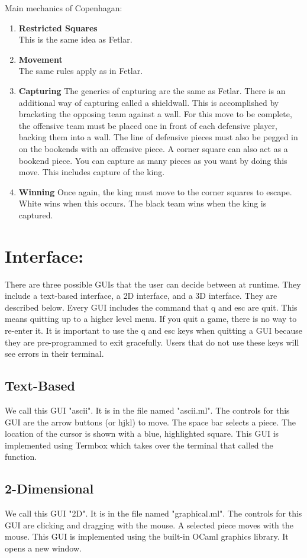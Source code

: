 \documentclass[11pt, oneside]{article}
\begin{document}
Main mechanics of Copenhagan:
\begin{enumerate}
\item \textbf{Restricted Squares}\\
  This is the same idea as Fetlar.
\item \textbf{Movement}\\
  The same rules apply as in Fetlar.
\item \textbf{Capturing}
  The generics of capturing are the same as Fetlar. There is an additional way of capturing called a shieldwall.  This is accomplished by bracketing the opposing team against a wall.  For this move to be complete, the offensive team must be placed one in front of each defensive player, backing them into a wall.  The line of defensive pieces must also be pegged in on the bookends with an offensive piece. A corner square can also act as a bookend piece. You can capture as many pieces as you want by doing this move.  This includes capture of the king.
\item \textbf{Winning}
  Once again, the king must move to the corner squares to escape.  White wins when this occurs.  The black team wins when the king is captured.
\end{enumerate}


\section{Interface:}
There are three possible GUIs that the user can decide between at runtime.  They include a text-based interface, a 2D interface, and a 3D interface.  They are described below.  Every GUI includes the command that q and esc are quit.  This means quitting up to a higher level menu. If you quit a game, there is no way to re-enter it.  It is important to use the q and esc keys when quitting a GUI because they are pre-programmed to exit gracefully.  Users that do not use these keys will see errors in their terminal.

\subsection{Text-Based}
We call this GUI "ascii".  It is in the file named "ascii.ml".  The controls for this GUI are the arrow buttons (or hjkl) to move.  The space bar selects a piece.  The location of the cursor is shown with a blue, highlighted square.  This GUI is implemented using Termbox which takes over the terminal that called the function.

\subsection{2-Dimensional}
We call this GUI "2D".  It is in the file named "graphical.ml".  The controls for this GUI are clicking and dragging with the mouse.  A selected piece moves with the mouse.  This GUI is implemented using the built-in OCaml graphics library.  It opens a new window.
\end{document}
